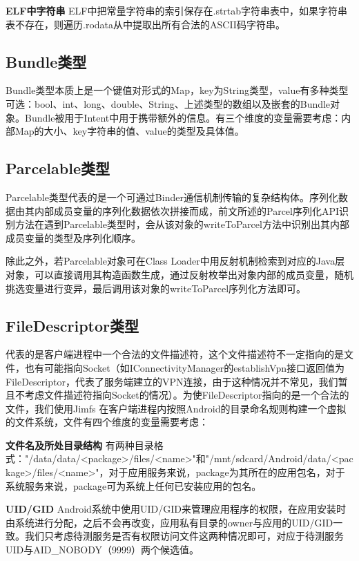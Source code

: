 \documentclass[winfonts,master,twoside]{njuthesis}
\begin{document}
\textbf{ELF中字符串} \quad ELF中把常量字符串的索引保存在.strtab字符串表中，如果字符串表不存在，则遍历.rodata从中提取出所有合法的ASCII码字符串。

\subsection{Bundle类型} 

Bundle类型本质上是一个键值对形式的Map，key为String类型，value有多种类型可选：bool、int、long、double、String、上述类型的数组以及嵌套的Bundle对象。Bundle被用于Intent中用于携带额外的信息。有三个维度的变量需要考虑：内部Map的大小、key字符串的值、value的类型及具体值。

\subsection{Parcelable类型} 

Parcelable类型代表的是一个可通过Binder通信机制传输的复杂结构体。序列化数据由其内部成员变量的序列化数据依次拼接而成，前文所述的Parcel序列化API识别方法在遇到Parcelable类型时，会从该对象的writeToParcel方法中识别出其内部成员变量的类型及序列化顺序。

除此之外，若Parcelable对象可在Class Loader中用反射机制检索到对应的Java层对象，可以直接调用其构造函数生成，通过反射枚举出对象内部的成员变量，随机挑选变量进行变异，最后调用该对象的writeToParcel序列化方法即可。

\subsection{FileDescriptor类型}

代表的是客户端进程中一个合法的文件描述符，这个文件描述符不一定指向的是文件，也有可能指向Socket（如IConnectivityManager的establishVpn接口返回值为FileDescriptor，代表了服务端建立的VPN连接，由于这种情况并不常见，我们暂且不考虑文件描述符指向Socket的情况）。为使FileDescriptor指向的是一个合法的文件，我们使用Jimfs \cite{jimfs}在客户端进程内按照Android的目录命名规则构建一个虚拟的文件系统，文件有四个维度的变量需要考虑：

\textbf{文件名及所处目录结构} \quad 有两种目录格式："/data/data/<package>/files/<name>"和"/mnt/sdcard/Android/data/<package>/files/<name>"，对于应用服务来说，package为其所在的应用包名，对于系统服务来说，package可为系统上任何已安装应用的包名。

\textbf{UID/GID} \quad Android系统中使用UID/GID来管理应用程序的权限，在应用安装时由系统进行分配，之后不会再改变，应用私有目录的owner与应用的UID/GID一致。我们只考虑待测服务是否有权限访问文件这两种情况即可，对应于待测服务UID与AID\_NOBODY（9999）两个候选值。
\end{document}
